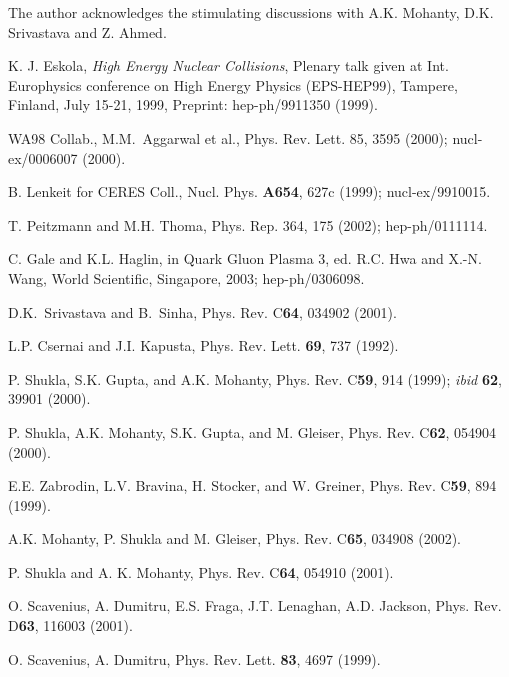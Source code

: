 \acknowledgements
 The author acknowledges the stimulating discussions with A.K.
Mohanty, D.K. Srivastava and Z. Ahmed.


\begin{thebibliography}{00}

 K. J. Eskola, {\it High Energy Nuclear Collisions}, 
  Plenary talk given at Int. Europhysics conference on High Energy Physics 
  (EPS-HEP99), Tampere, Finland, July 15-21, 1999, 
  Preprint: hep-ph/9911350 (1999).
  
 WA98 Collab., M.M.\ Aggarwal et al., 
            Phys. Rev. Lett. 85, 3595 (2000); nucl-ex/0006007 (2000).

 B. Lenkeit for CERES Coll., 
        Nucl. Phys. {\bf A654}, 627c (1999); nucl-ex/9910015.  
  
 T. Peitzmann and M.H. Thoma, Phys. Rep. 364, 175 (2002);
                    hep-ph/0111114.

 C. Gale and K.L. Haglin, in {Quark Gluon Plasma 3},
    ed. R.C. Hwa and X.-N. Wang, World Scientific, Singapore, 2003;
    hep-ph/0306098. 
          
 D.K.\ Srivastava and B.\ Sinha, 
            Phys. Rev. C{\bf 64}, 034902 (2001). 

 L.P. Csernai and J.I. Kapusta, Phys. Rev. Lett. {\bf 69},
               737 (1992).

 P. Shukla, S.K. Gupta, and A.K. Mohanty,
         Phys. Rev. C{\bf 59}, 914 (1999); {\it ibid} {\bf 62}, 39901 (2000).

 P. Shukla, A.K. Mohanty, S.K. Gupta, and M. Gleiser,
              Phys. Rev. C{\bf 62}, 054904 (2000).

 E.E. Zabrodin, L.V. Bravina, H. Stocker, and W. Greiner,
         Phys. Rev. C{\bf 59}, 894 (1999).

 A.K. Mohanty, P. Shukla and M. Gleiser,
              Phys. Rev. C{\bf 65}, 034908 (2002).
              
 P. Shukla and A. K. Mohanty, Phys. Rev. C{\bf 64},
        054910 (2001).              

 O. Scavenius, A. Dumitru, E.S. Fraga, J.T. Lenaghan,
         A.D. Jackson, Phys. Rev. D{\bf 63}, 116003 (2001).

 O. Scavenius, A. Dumitru,
         Phys. Rev. Lett. {\bf 83}, 4697 (1999).
         

\end{thebibliography}
